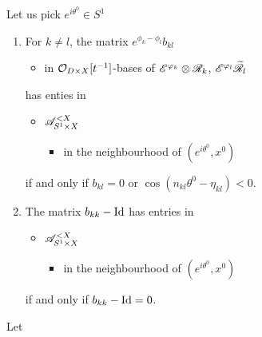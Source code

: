 \begin{lem}
  Let us pick $e^{i\theta^0}\in S^1$
  \begin{enumerate}
    \item For $k\neq l$, the matrix $e^{\phi_k-\phi_l}b_{kl}$
      \begin{itemize}
        \item in $\mathcal{O}_{D\times X}[t^{-1}]$-bases of $\mathscr{E}^{\varphi_k}\otimes\mathscr{R}_k$,
          $\mathscr{E}^{\varphi_l}\widetilde{\mathscr{R}}_l$
      \end{itemize}
      has enties in
      \begin{itemize}
        \item $\mathscr{A}_{S^1\times X}^{<X}$
          \begin{itemize}
            \item in the neighbourhood of $(e^{i\theta^0},x^0)$
          \end{itemize}
      \end{itemize}
      if and only if $b_{kl}=0$ or
      $\cos(n_{kl}\theta^0-\eta_{kl})<0$.
    \item The matrix $b_{kk}-\operatorname{Id}$ has entries in
      \begin{itemize}
        \item $\mathscr{A}_{S^1\times X}^{<X}$
          \begin{itemize}
            \item in the neighbourhood of $(e^{i\theta^0},x^0)$
          \end{itemize}
      \end{itemize}
      if and only if $b_{kk}-\operatorname{Id}=0$.
  \end{enumerate}
  \begin{comment}
    \begin{proof}[Proofsketch]
      For the first point, it is enough to check that $e^{\phi_k-\phi_l}$
      belongs to $\sA_{S^1\times X}^{<X}$ in the neighbourhood of
      $(e^{i\theta^0},x^0)$ if and only if $\Re(\phi_k-\phi_l)<0$ on a
      sufficiently small neighbourhood of $(e^{i\theta^0},x^0)$, then to
      express this condition on the leading term of $\phi_k-\phi_l$.  Then, one
      notices that, as $b_{kl}$ has moderate growth, it does not affect the
      rapid decay or the exponential growth property.
    \end{proof}
  \end{comment}
\end{lem}
Let
